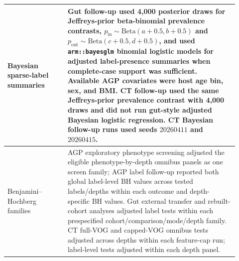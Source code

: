 \begin{landscape}
\begin{longtable}{p{0.24\linewidth}p{0.68\linewidth}}
\midrule
Bayesian sparse-label summaries &
Gut follow-up used 4,000 posterior draws for Jeffreys-prior beta-binomial prevalence contrasts, \(p_{\mathrm{in}}\sim\mathrm{Beta}(a+0.5,b+0.5)\) and \(p_{\mathrm{out}}\sim\mathrm{Beta}(c+0.5,d+0.5)\), and used \texttt{arm::bayesglm} binomial logistic models for adjusted label-presence summaries when complete-case support was sufficient. Available AGP covariates were host age bin, sex, and BMI. CT follow-up used the same Jeffreys-prior prevalence contrast with 4,000 draws and did not run gut-style adjusted Bayesian logistic regression. CT Bayesian follow-up runs used seeds \(20260411\) and \(20260415\). \\
\midrule
Benjamini--Hochberg families &
AGP exploratory phenotype screening adjusted the eligible phenotype-by-depth omnibus panels as one screen family; AGP label follow-up reported both global label-level BH values across tested labels/depths within each outcome and depth-specific BH values. Gut external transfer and rebuilt-cohort analyses adjusted label tests within each prespecified cohort/comparison/mode/depth family. CT full-VOG and capped-VOG omnibus tests adjusted across depths within each feature-cap run; label-level tests adjusted within each depth panel. \\
\end{longtable}



\endgroup
\end{landscape}
